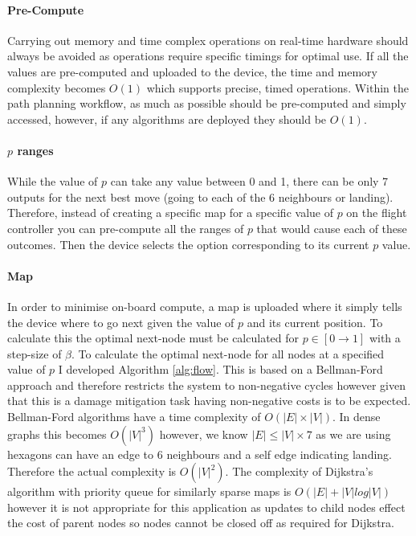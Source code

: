 \paragraph{Pre-Compute}
Carrying out memory and time complex operations on real-time hardware should always be avoided as operations require specific timings for optimal use. If all the values are pre-computed and uploaded to the device, the time and memory complexity becomes $O(1)$ which supports precise, timed operations. Within the path planning workflow, as much as possible should be pre-computed and simply accessed, however, if any algorithms are deployed they should be $O(1)$.
\paragraph{$p$ ranges}
While the value of $p$ can take any value between 0 and 1, there can be only 7 outputs for the next best move (going to each of the 6 neighbours or landing). Therefore, instead of creating a specific map for a specific value of $p$ on the flight controller you can pre-compute all the ranges of $p$ that would cause each of these outcomes. Then the device selects the option corresponding to its current $p$ value.
\paragraph{Map}
In order to minimise on-board compute, a map is uploaded where it simply tells the device where to go next given the value of $p$ and its current position. To calculate this the optimal next-node must be calculated for $p\in[0\to1]$ with a step-size of $\beta$.  To calculate the optimal next-node for all nodes at a specified value of $p$ I developed Algorithm \ref{alg:flow}. This is based on a Bellman-Ford approach and therefore restricts the system to non-negative cycles however given that this is a damage mitigation task having non-negative costs is to be expected.  Bellman-Ford algorithms have a time complexity of $O(|E|\times |V|)$. In dense graphs this becomes  $O(|V|^3)$ however, we know $|E| \leq |V| \times 7$ as we are using hexagons can have an edge to 6 neighbours and a self edge indicating landing. Therefore the actual complexity is $O(|V|^2)$\cite{cormen2009}. The complexity of Dijkstra's algorithm with priority queue for similarly sparse maps is $O(|E| + |V|log|V|)$ however it is not appropriate for this application as updates to child nodes effect the cost of parent nodes so nodes cannot be closed off as required for Dijkstra.

